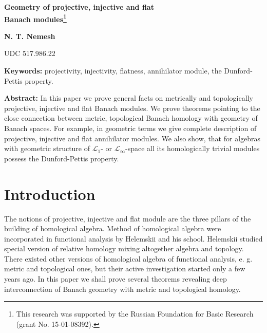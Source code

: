 \documentclass[12pt]{article}
\begin{document}
\begin{flushleft}
\Large \textbf{Geometry of projective, injective and flat\\ Banach modules\footnote{This research was supported by the Russian Foundation for Basic Research (grant No. 15-01-08392).}}\\[0.5cm]
\end{flushleft}
\begin{flushright}
\normalsize \textbf{N. T. Nemesh}\\[0.5cm]
\end{flushright}
\begin{flushleft}
\small {UDC 517.986.22}\\[0.5cm]
\end{flushleft}

\thispagestyle{empty}

\textbf{Keywords:} projectivity, injectivity, flatness, annihilator module, the Dunford-Pettis property.
\medskip

\textbf{Abstract:} In this paper we prove general facts on metrically and topologically projective, injective and flat Banach modules. We prove theorems pointing to the close connection between metric, topological Banach homology with geometry of Banach spaces. For example, in geometric terms we give complete description of projective, injective and flat annihilator modules. We also show, that for algebras with geometric structure of $\mathscr{L}_1$- or $\mathscr{L}_\infty$-space all its homologically trivial modules possess the Dunford-Pettis property.
\medskip


\section{Introduction}
\label{SectionIntroduction}

The notions of projective, injective and flat module are the three pillars of the building of homological algebra. Method of homological algebra were incorporated in functional analysis by Helemskii and his school. Helemskii studied special version of relative homology mixing altogether algebra and topology. There existed other versions of homological algebra of functional analysis, e. g. metric and topological ones, but their active investigation started only a few years ago. In this paper we shall prove several theorems revealing deep interconnection of Banach geometry with metric and topological homology.
\end{document}
